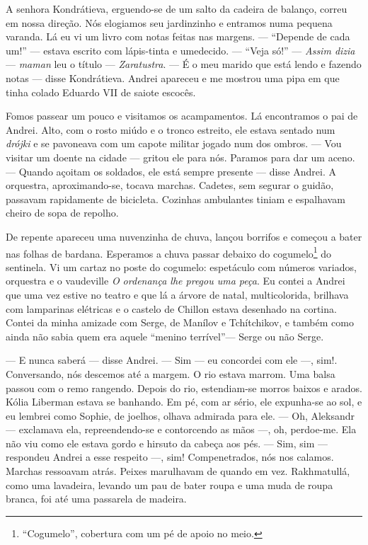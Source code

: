 A senhora Kondrátieva, erguendo-se de um salto da cadeira de balanço,
correu em nossa direção. Nós elogiamos seu jardinzinho e entramos numa
pequena varanda. Lá eu vi um livro com notas feitas nas margens. ---
``Depende de cada um!'' --- estava escrito com lápis-tinta e umedecido.
--- ``Veja só!'' --- \emph{Assim dizia} --- \emph{maman} leu o título
--- \emph{Zaratustra}. --- É o meu marido que está lendo e fazendo notas
--- disse Kondrátieva. Andrei apareceu e me mostrou uma pipa em que
tinha colado Eduardo VII de saiote escocês.

Fomos passear um pouco e visitamos os acampamentos. Lá encontramos o pai
de Andrei. Alto, com o rosto miúdo e o tronco estreito, ele estava
sentado num \emph{drójki} e se pavoneava com um capote militar jogado
num dos ombros. --- Vou visitar um doente na cidade --- gritou ele para
nós. Paramos para dar um aceno. --- Quando açoitam os soldados, ele está
sempre presente --- disse Andrei. A orquestra, aproximando-se, tocava
marchas. Cadetes, sem segurar o guidão, passavam rapidamente de
bicicleta. Cozinhas ambulantes tiniam e espalhavam cheiro de sopa de
repolho.

De repente apareceu uma nuvenzinha de chuva, lançou borrifos e começou a
bater nas folhas de bardana. Esperamos a chuva passar debaixo do
cogumelo\footnote{``Cogumelo'', cobertura com um pé de apoio no meio.}
do sentinela. Vi um cartaz no poste do cogumelo: espetáculo com números
variados, orquestra e o vaudeville \emph{O ordenança lhe pregou uma
peça}. Eu contei a Andrei que uma vez estive no teatro e que lá a árvore
de natal, multicolorida, brilhava com lamparinas elétricas e o castelo
de Chillon estava desenhado na cortina. Contei da minha amizade com
Serge, de Manílov e Tchítchikov, e também como ainda não sabia quem era
aquele ``menino terrível''--- Serge ou não Serge.

--- E nunca saberá --- disse Andrei. --- Sim --- eu concordei com ele
---, sim!. Conversando, nós descemos até a margem. O rio estava marrom.
Uma balsa passou com o remo rangendo. Depois do rio, estendiam-se morros
baixos e arados. Kólia Liberman estava se banhando. Em pé, com ar sério,
ele expunha-se ao sol, e eu lembrei como Sophie, de joelhos, olhava
admirada para ele. --- Oh, Aleksandr --- exclamava ela, repreendendo-se
e contorcendo as mãos ---, oh, perdoe-me. Ela não viu como ele estava
gordo e hirsuto da cabeça aos pés. --- Sim, sim --- respondeu Andrei a
esse respeito ---, sim! Compenetrados, nós nos calamos. Marchas
ressoavam atrás. Peixes marulhavam de quando em vez. Rakhmatullá, como
uma lavadeira, levando um pau de bater roupa e uma muda de roupa branca,
foi até uma passarela de madeira.

